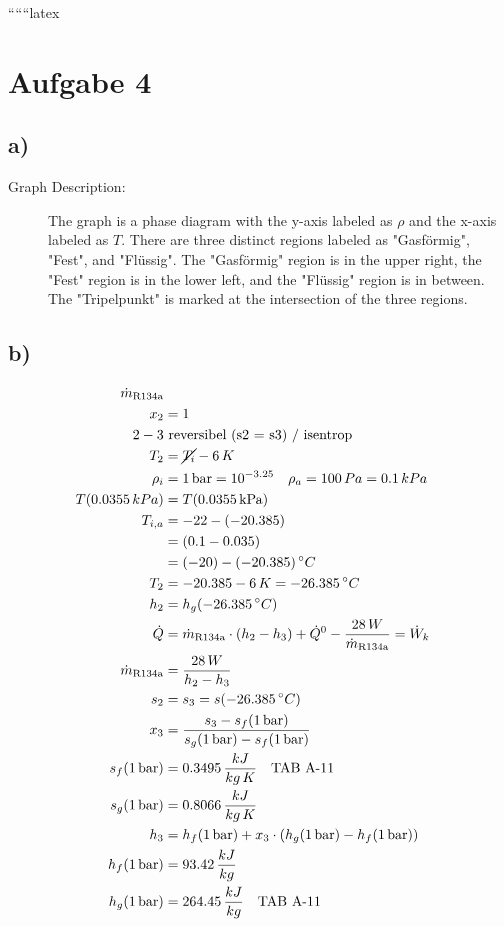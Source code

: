 
``````latex


\section*{Aufgabe 4}

\subsection*{a)}

\begin{description}
    \item[Graph Description:] The graph is a phase diagram with the y-axis labeled as $\rho$ and the x-axis labeled as $T$. There are three distinct regions labeled as "Gasförmig", "Fest", and "Flüssig". The "Gasförmig" region is in the upper right, the "Fest" region is in the lower left, and the "Flüssig" region is in between. The "Tripelpunkt" is marked at the intersection of the three regions.
\end{description}

\subsection*{b)}

\begin{align*}
    \dot{m}_{\text{R134a}} \\
    x_2 &= 1 \\
    2-3 &\text{ reversibel (s2 = s3) / isentrop} \\
    T_2 &= \cancel{T_i} - 6\,K \\
    \rho_i &= 1\,\text{bar} = 10^{-3.25} \quad \rho_a = 100\,Pa = 0.1\,kPa \\
    T(0.0355\,kPa) &= T(0.0355\,\text{kPa}) \\
    T_{i,a} &= -22 - (-20.385) \\
    &= (0.1 - 0.035) \\
    &= (-20) - (-20.385)\,^\circ C \\
    T_2 &= -20.385 - 6\,K = -26.385\,^\circ C \\
    h_2 &= h_g(-26.385\,^\circ C) \\
    \dot{Q} &= \dot{m}_{\text{R134a}} \cdot (h_2 - h_3) + \dot{Q}^0 - \frac{28\,W}{\dot{m}_{\text{R134a}}} = \dot{W}_k \\
    \dot{m}_{\text{R134a}} &= \frac{28\,W}{h_2 - h_3} \\
    s_2 &= s_3 = s(-26.385\,^\circ C) \\
    x_3 &= \frac{s_3 - s_f(1\,\text{bar})}{s_g(1\,\text{bar}) - s_f(1\,\text{bar})} \\
    s_f(1\,\text{bar}) &= 0.3495\,\frac{kJ}{kg\,K} \quad \text{TAB A-11} \\
    s_g(1\,\text{bar}) &= 0.8066\,\frac{kJ}{kg\,K} \\
    h_3 &= h_f(1\,\text{bar}) + x_3 \cdot \left( h_g(1\,\text{bar}) - h_f(1\,\text{bar}) \right) \\
    h_f(1\,\text{bar}) &= 93.42\,\frac{kJ}{kg} \\
    h_g(1\,\text{bar}) &= 264.45\,\frac{kJ}{kg} \quad \text{TAB A-11}
\end{align*}

